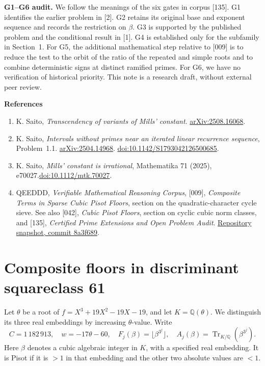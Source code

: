 \documentclass[11pt,a4paper,oneside,openany]{book}
\newcommand{\Q}{\mathbb Q}\newcommand{\C}{\mathbb C}\newcommand{\Z}{\mathbb Z}\newcommand{\F}{\mathbb F}\newcommand{\Tr}{\operatorname{Tr}}\newcommand{\Nm}{\operatorname{N}}\newcommand{\ord}{\operatorname{ord}}\newcommand{\K}{K}\newcommand{\OO}{\mathcal O_K}\newcommand{\unit}{\mathcal U}
\newcommand{\lead}[1]{\textbf{#1}\enspace}\let\para\lead
\begin{document}
\lead{G1--G6 audit.} We follow the meanings of the six gates in corpus [135]. G1 identifies the earlier problem in [2]. G2 retains its original base and exponent sequence and records the restriction on $\beta$. G3 is supported by the published problem and the conditional result in [1]. G4 is established only for the subfamily in Section~1. For G5, the additional mathematical step relative to [009] is to reduce the test to the orbit of the ratio of the repeated and simple roots and to combine deterministic signs at distinct ramified primes. For G6, we have no verification of historical priority. This note is a research draft, without external peer review.

\medskip
\lead{References}
\begin{enumerate}
\item K. Saito, \emph{Transcendency of variants of Mills' constant}. \href{https://arxiv.org/abs/2508.16068}{arXiv:2508.16068}.
\item K. Saito, \emph{Intervals without primes near an iterated linear recurrence sequence}, Problem~1.1. \href{https://arxiv.org/abs/2504.14968}{arXiv:2504.14968}. \href{https://doi.org/10.1142/S1793042126500685}{doi:10.1142/S1793042126500685}.
\item K. Saito, \emph{Mills' constant is irrational}, Mathematika 71 (2025), e70027.\newline\href{https://doi.org/10.1112/mtk.70027}{doi:10.1112/mtk.70027}.
\item QEEDDD, \emph{Verifiable Mathematical Reasoning Corpus}, [009], \emph{Composite Terms in Sparse Cubic Pisot Floors}, section on the quadratic-character cycle sieve. See also [042], \emph{Cubic Pisot Floors}, section on cyclic cubic norm classes, and [135], \emph{Certified Prime Extensions and Open Problem Audit}. \href{https://github.com/QEEDDD/Verifiable-Mathematical-Reasoning-Corpus/tree/8a3f6895d0b9b9f125e43157e4a003a2a2b51704}{Repository snapshot, commit 8a3f689}.
\end{enumerate}


\chapter{Composite floors in discriminant squareclass 61}\label{ch:d61}
Let $\theta$ be a root of $f=X^3+19X^2-19X-19$, and let $K=\Q(\theta)$.
We distinguish its three real embeddings by increasing $\theta$-value. Write
\[
 C=1\,182\,913,\quad w=-17\theta-60,\quad
 F_j(\beta)=\lfloor\beta^{3^j}\rfloor,\quad A_j(\beta)=\Tr_{K/\Q}(\beta^{3^j}).
\]
Here $\beta$ denotes a cubic algebraic integer in $K$, with a specified real embedding. It is Pisot if it is $>1$ in that embedding and the other two absolute values are $<1$.
\end{document}
